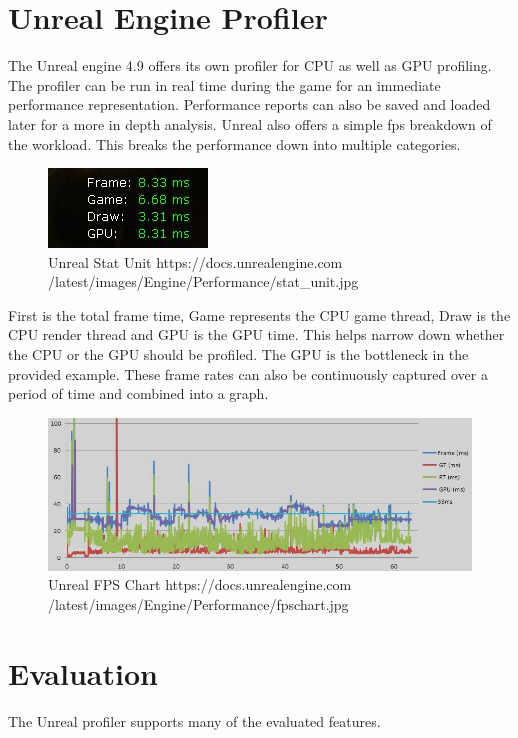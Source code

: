\section{Unreal Engine Profiler}

The Unreal engine 4.9 offers its own profiler for CPU as well as GPU profiling. The profiler can be run in real time during the game for an immediate performance representation. Performance reports can also be saved and loaded later for a more in depth analysis.  Unreal also offers a simple fps breakdown of the workload. This breaks the performance down into multiple categories. 

\begin{figure}[htbp]
\includegraphics[scale = 0.8]{img/Unreal_Stat.jpg}
\caption{Unreal Stat Unit
https://docs.unrealengine.com
/latest/images/Engine/Performance/stat\_unit.jpg}
\label{fig:UnrealStat}
\end{figure}

First is the total frame time, Game represents the CPU game thread, Draw is the CPU render thread and GPU is the GPU time. This helps narrow down whether the CPU or the GPU should be profiled. The GPU is the bottleneck in the provided example. These frame rates can also be continuously captured over a period of time and combined into a graph.
\citep{unreal_performance_profiling}

\begin{figure}[htbp]
\includegraphics[scale = 0.3]{img/Unreal_FpsChart.jpg}
\caption{Unreal FPS Chart
https://docs.unrealengine.com
/latest/images/Engine/Performance/fpschart.jpg}
\label{fig:UnrealFPSChart}
\end{figure}


\section{Evaluation}
The Unreal profiler supports many of the evaluated features.

